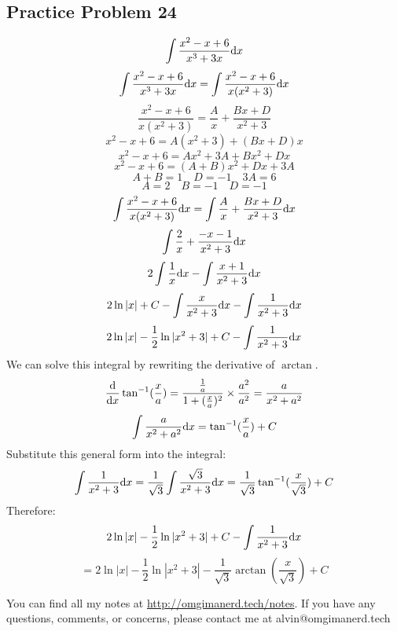 \documentclass{math}
\begin{document}
\subsection*{Practice Problem 24}
\[ \int{\frac{x^{2}-x+6}{x^{3}+3x}\mathrm{d}{x}} \]
\[ \int{\frac{x^{2}-x+6}{x^{3}+3x}\mathrm{d}{x}} =
   \int{\frac{x^{2}-x+6}{x(x^{2}+3)}\mathrm{d}{x}} \]
\[ \frac{x^{2}-x+6}{x(x^{2}+3)} = \frac{A}{x}+\frac{Bx+D}{x^{2}+3} \]
\[ x^{2}-x+6 = A(x^{2}+3)+(Bx+D)x \]
\[ x^{2}-x+6 = Ax^{2}+3A+Bx^{2}+Dx \]
\[ x^{2}-x+6 = (A+B)x^{2}+Dx+3A \]
\[ A+B = 1 \quad D = -1 \quad 3A = 6 \]
\[ A = 2 \quad B = -1 \quad D = -1 \]
\[ \int{\frac{x^{2}-x+6}{x(x^{2}+3)}\mathrm{d}{x}} =
   \int{\frac{A}{x}+\frac{Bx+D}{x^{2}+3}\mathrm{d}{x}} \]
\[ \int{\frac{2}{x}+\frac{-x-1}{x^{2}+3}\mathrm{d}{x}} \]
\[ 2\int{\frac{1}{x}\mathrm{d}{x}}-\int{\frac{x+1}{x^{2}+3}\mathrm{d}{x}} \]
\[ 2\ln|x|+C-\int{\frac{x}{x^{2}+3}\mathrm{d}{x}}-\int{\frac{1}{x^{2}+3}\mathrm{d}{x}} \]
\[ 2\ln|x|-\frac{1}{2}\ln|x^{2}+3|+C-\int{\frac{1}{x^{2}+3}\mathrm{d}{x}} \]
We can solve this integral by rewriting the derivative of \( \arctan \).
\[ \frac{\mathrm{d}}{\mathrm{d}{x}}\tan^{-1}(\frac{x}{a}) =
   \frac{\frac{1}{a}}{1+(\frac{x}{a})^{2}}\times\frac{a^{2}}{a^{2}} =
   \frac{a}{x^{2}+a^{2}} \]
\[ \int{\frac{a}{x^{2}+a^{2}}\mathrm{d}{x}} = \tan^{-1}(\frac{x}{a})+C \]
Substitute this general form into the integral:
\[ \int{\frac{1}{x^{2}+3}\mathrm{d}{x}} =
   \frac{1}{\sqrt{3}}\int{\frac{\sqrt{3}}{x^{2}+3}\mathrm{d}{x}} =
   \frac{1}{\sqrt{3}}\tan^{-1}(\frac{x}{\sqrt{3}})+C \]
Therefore:
\[ 2\ln|x|-\frac{1}{2}\ln|x^{2}+3|+C-\int{\frac{1}{x^{2}+3}\mathrm{d}{x}} \]
\[ = 2\ln|x|-\frac{1}{2}\ln|x^{2}+3|-
   \frac{1}{\sqrt{3}}\arctan(\frac{x}{\sqrt{3}})+C \]

\begin{center}
  You can find all my notes at \url{http://omgimanerd.tech/notes}. If you have
  any questions, comments, or concerns, please contact me at
  alvin@omgimanerd.tech
\end{center}
\end{document}
